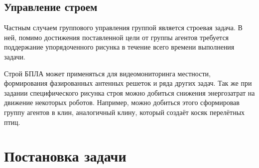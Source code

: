 \documentclass[a4paper, 14pt]{extarticle}
\begin{document}
\subsection{Управление строем}
Частным случаем группового управления группой является строевая задача. В ней, помимо достижения поставленной цели от группы агентов требуется поддержание упорядоченного рисунка в течение всего времени выполнения задачи. \par 
Строй БПЛА может применяться для видеомониторинга местности, формирования фазированных антенных решеток и ряда других задач. Так же при задании специфического рисунка строя можно добиться снижения энергозатрат на движение некоторых роботов. Например, можно добиться этого сформировав группу агентов в клин, аналогичный клину, который создаёт косяк перелётных птиц.
\section{Постановка задачи}
\end{document}
